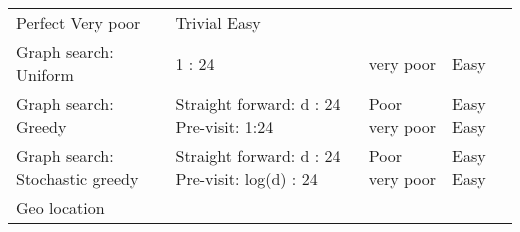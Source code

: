 \documentclass[10pt,oneside]{memoir}
\begin{document}
\begin{longtable}[]{@{}llll@{}}
\begin{minipage}[t]{0.13\columnwidth}
Perfect Very poor\strut
\end{minipage} & \begin{minipage}[t]{0.13\columnwidth}\raggedright
Trivial Easy\strut
\end{minipage}\tabularnewline
\begin{minipage}[t]{0.28\columnwidth}\raggedright
Graph search: Uniform\strut
\end{minipage} & \begin{minipage}[t]{0.35\columnwidth}\raggedright
1 : 24\strut
\end{minipage} & \begin{minipage}[t]{0.13\columnwidth}\raggedright
very poor\strut
\end{minipage} & \begin{minipage}[t]{0.13\columnwidth}\raggedright
Easy\strut
\end{minipage}\tabularnewline
\begin{minipage}[t]{0.28\columnwidth}\raggedright
Graph search: Greedy\strut
\end{minipage} & \begin{minipage}[t]{0.35\columnwidth}\raggedright
Straight forward: d : 24 Pre-visit: 1:24\strut
\end{minipage} & \begin{minipage}[t]{0.13\columnwidth}\raggedright
Poor very poor\strut
\end{minipage} & \begin{minipage}[t]{0.13\columnwidth}\raggedright
Easy Easy\strut
\end{minipage}\tabularnewline
\begin{minipage}[t]{0.28\columnwidth}\raggedright
Graph search: Stochastic greedy\strut
\end{minipage} & \begin{minipage}[t]{0.35\columnwidth}\raggedright
Straight forward: d : 24 Pre-visit: log(d) : 24\strut
\end{minipage} & \begin{minipage}[t]{0.13\columnwidth}\raggedright
Poor very poor\strut
\end{minipage} & \begin{minipage}[t]{0.13\columnwidth}\raggedright
Easy Easy\strut
\end{minipage}\tabularnewline
\begin{minipage}[t]{0.28\columnwidth}\raggedright
Geo location\strut
\end{minipage} & \begin{minipage}[t]{0.35\columnwidth}\raggedright

\end{minipage}
\end{longtable}
\end{document}
